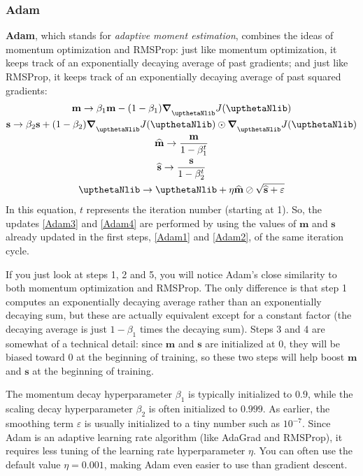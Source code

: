 \subsubsection{Adam}
\textbf{Adam}, which stands for \emph{adaptive moment estimation}, combines the ideas of momentum optimization and RMSProp: just like momentum optimization, it keeps track of an exponentially decaying average of past gradients; and just like RMSProp, it keeps track of an exponentially decaying average of past squared gradients:
\begin{gather}
\mathbf{m}\rightarrow\beta_1\mathbf{m}-(1-\beta_1)\boldsymbol{\nabla}_{\boldtheta}J(\boldtheta)\label{Adam1}\\
\mathbf{s}\rightarrow\beta_2\mathbf{s}+(1-\beta_2)\boldsymbol{\nabla}_{\boldtheta}J(\boldtheta)\odot\boldsymbol{\nabla}_{\boldtheta}J(\boldtheta)\label{Adam2}\\
\widehat{\mathbf{m}}\rightarrow\frac{\mathbf{m}}{1-\beta_1^t}\label{Adam3}\\
\widehat{\mathbf{s}}\rightarrow\frac{\mathbf{s}}{1-\beta_2^t}\label{Adam4}\\
\boldtheta\rightarrow\boldtheta+\eta\widehat{\mathbf{m}}\oslash\sqrt{\widehat{\mathbf{s}}+\varepsilon}
\end{gather}
In this equation, $t$ represents the iteration number (starting at 1). So, the updates \eqref{Adam3} and \eqref{Adam4} are performed by using the values of $\mathbf{m}$ and $\mathbf{s}$ already updated in the first steps, \eqref{Adam1} and \eqref{Adam2}, of the same iteration cycle.

If you just look at steps 1, 2 and 5, you will notice Adam's close similarity to both momentum optimization and RMSProp. The only difference is that step 1 computes an exponentially decaying average rather than an exponentially decaying sum, but these are actually equivalent except for a constant factor (the decaying average is just $1-\beta_1$ times the decaying sum). Steps 3 and 4 are somewhat of a technical detail: since $\mathbf{m}$ and $\mathbf{s}$ are initialized at 0, they will be biased toward 0 at the beginning of training, so these two steps will help boost $\mathbf{m}$ and $\mathbf{s}$ at the beginning of training.

The momentum decay hyperparameter $\beta_1$ is typically initialized to $0.9$, while the scaling decay hyperparameter $\beta_2$ is often initialized to $0.999$. As earlier, the smoothing term $\varepsilon$ is usually initialized to a tiny number such as $10^{-7}$. Since Adam is an adaptive learning rate algorithm (like AdaGrad and RMSProp), it requires less tuning of the learning rate hyperparameter $\eta$. You can often use the default value $\eta=0.001$, making Adam even easier to use than gradient descent.
